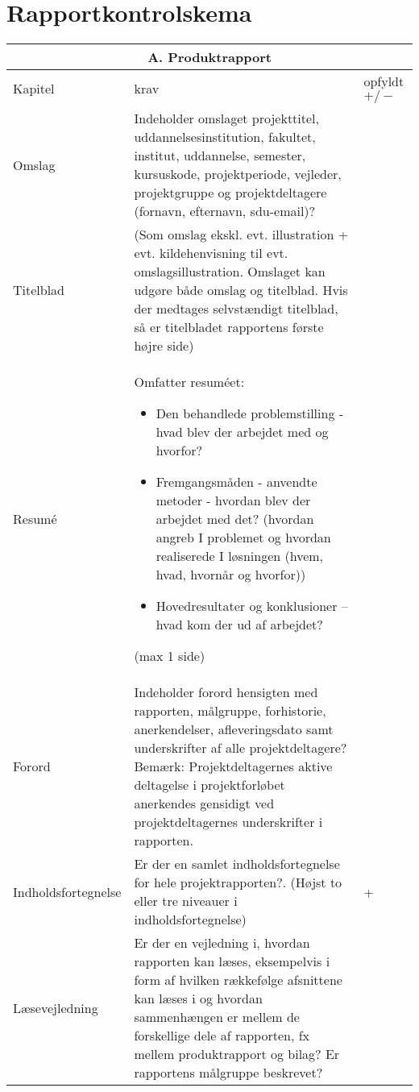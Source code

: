 \section{Rapportkontrolskema}
\begin{center}
\begin{longtable}{|m{3.5cm}|m{10cm}|m{2.5cm}|}
\hline
\multicolumn{3}{|c|}{A. Produktrapport} \\
\hline
Kapitel & krav & opfyldt $+/-$ \\ \hline
Omslag & Indeholder omslaget projekttitel, uddannelsesinstitution, fakultet, institut, uddannelse, semester, kursuskode, projektperiode, vejleder, projektgruppe og projektdeltagere (fornavn, efternavn, sdu-email)? & \\
\hline
Titelblad & (Som omslag ekskl. evt. illustration + evt. kildehenvisning til evt. omslagsillustration. Omslaget kan udgøre både omslag og titelblad. Hvis der medtages selvstændigt titelblad, så er titelbladet rapportens første højre side) & \\
\hline
Resumé & 
Omfatter resuméet:
\begin{itemize}
\item Den behandlede problemstilling - hvad blev der arbejdet med og hvorfor?
\item Fremgangsmåden - anvendte metoder - hvordan blev der arbejdet med det? 
(hvordan angreb I problemet og hvordan realiserede I løsningen (hvem, hvad, hvornår og hvorfor))
\item Hovedresultater og konklusioner  – hvad kom der ud af arbejdet?
\end{itemize}
(max  1 side)& \\
\hline
Forord & Indeholder forord hensigten med rapporten, målgruppe, forhistorie, anerkendelser, afleveringsdato samt underskrifter af alle projektdeltagere? \newline
Bemærk: Projektdeltagernes aktive deltagelse i projektforløbet anerkendes gensidigt ved projektdeltagernes underskrifter i rapporten. & \\
\hline
Indholdsfortegnelse & Er der en samlet indholdsfortegnelse for hele projektrapporten?. (Højst to eller tre niveauer i indholdsfortegnelse) & + \\
\hline
Læsevejledning & Er der en vejledning i, hvordan rapporten kan læses, eksempelvis i form af hvilken rækkefølge afsnittene kan læses i og hvordan sammenhængen er mellem de forskellige dele af rapporten, fx mellem produktrapport og bilag? 
\newline Er rapportens målgruppe beskrevet? & \\

\end{longtable}
\end{center}
